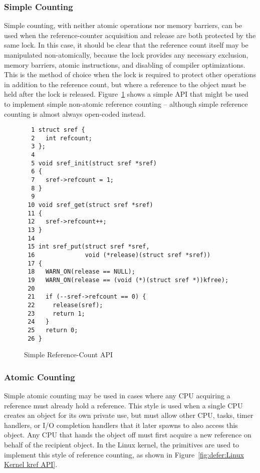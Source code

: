 \subsubsection{Simple Counting}
\label{sec:defer:Simple Counting}

Simple counting, with neither atomic operations nor memory barriers,
can be used when the reference-counter acquisition and release are
both protected by the same lock.
In this case, it should be clear that the reference count itself
may be manipulated non-atomically, because the lock provides any
necessary exclusion, memory barriers, atomic instructions, and disabling
of compiler optimizations.
This is the method of choice when the lock is required to protect
other operations in addition to the reference count, but where
a reference to the object must be held after the lock is released.
Figure~\ref{fig:defer:Simple Reference-Count API} shows a simple
API that might be used to implement simple non-atomic reference
counting -- although simple reference counting is almost always
open-coded instead.

\begin{figure}[htbp]
{ \scriptsize
\begin{verbatim}
  1 struct sref {
  2   int refcount;
  3 };
  4
  5 void sref_init(struct sref *sref)
  6 {
  7   sref->refcount = 1;
  8 }
  9
 10 void sref_get(struct sref *sref)
 11 {
 12   sref->refcount++;
 13 }
 14
 15 int sref_put(struct sref *sref,
 16              void (*release)(struct sref *sref))
 17 {
 18   WARN_ON(release == NULL);
 19   WARN_ON(release == (void (*)(struct sref *))kfree);
 20
 21   if (--sref->refcount == 0) {
 22     release(sref);
 23     return 1;
 24   }
 25   return 0;
 26 }
\end{verbatim}
}
\caption{Simple Reference-Count API}
\label{fig:defer:Simple Reference-Count API}
\end{figure}

\subsubsection{Atomic Counting}
\label{sec:defer:Atomic Counting}

Simple atomic counting may be used in cases where any CPU acquiring
a reference must already hold a reference.
This style is used when a single CPU creates an object for its
own private use, but must allow other CPU, tasks, timer handlers,
or I/O completion handlers that it later spawns to also access this object.
Any CPU that hands the object off must first acquire a new reference
on behalf of the recipient object.
In the Linux kernel, the  primitives are used to implement
this style of reference counting, as shown in
Figure~\ref{fig:defer:Linux Kernel kref API}.

